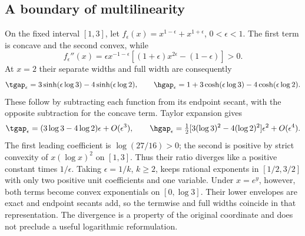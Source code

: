 \subsection{A boundary of multilinearity}\label{subsec:rational-powers}
\begin{example}\label{ex:rational-powers}
On the fixed interval $[1,3]$, let
$f_\epsilon(x)=x^{1-\epsilon}+x^{1+\epsilon}$, $0<\epsilon<1$.
The first term is concave and the second convex, while
\[
 f_\epsilon''(x)=\epsilon x^{-1-\epsilon}
       [(1+\epsilon)x^{2\epsilon}-(1-\epsilon)]>0.
\]
At $x=2$ their separate widths and full width are consequently
\[
 \tgap_\epsilon=3\sinh(\epsilon\log3)-4\sinh(\epsilon\log2),
 \qquad
 \hgap_\epsilon=1+3\cosh(\epsilon\log3)-4\cosh(\epsilon\log2).
\]
These follow by subtracting each function from its endpoint secant,
with the opposite subtraction for the concave term. Taylor expansion
gives
\[
 \tgap_\epsilon=(3\log3-4\log2)\epsilon+O(\epsilon^3),\qquad
 \hgap_\epsilon=\tfrac12[3(\log3)^2-4(\log2)^2]\epsilon^2
                                      +O(\epsilon^4).
\]
The first leading coefficient is $\log(27/16)>0$; the second is
positive by strict convexity of $x(\log x)^2$ on $[1,3]$.
Thus their ratio diverges like a positive constant times $1/\epsilon$.
Taking $\epsilon=1/k$, $k\ge2$, keeps rational exponents in
$[1/2,3/2]$ with only two positive unit coefficients and one variable.
Under $x=e^y$, however, both terms become convex exponentials on
$[0,\log3]$. Their lower envelopes are exact and endpoint secants
add, so the termwise and full widths coincide in that representation.
The divergence is a property of the original coordinate and does not
preclude a useful logarithmic reformulation.
\end{example}
